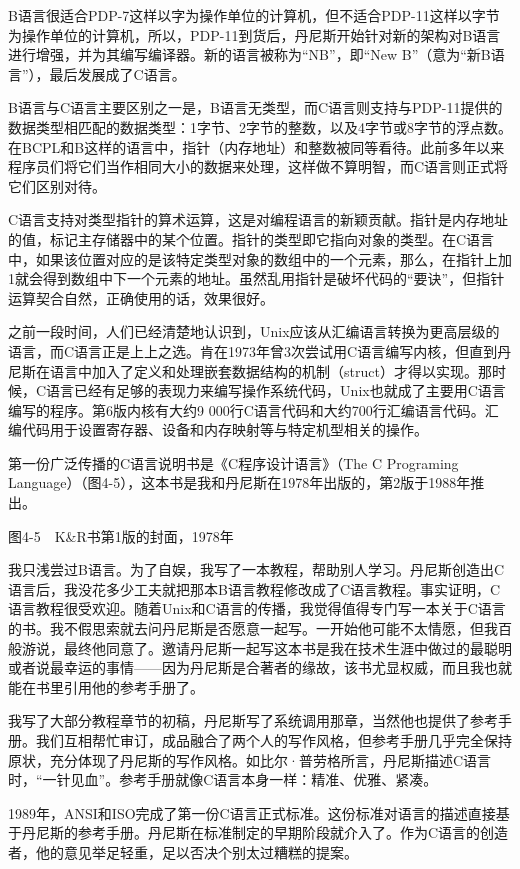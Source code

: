 \documentclass[a4paper,12pt,UTF8,twoside]{ctexbook}
\begin{document}
{B语言很适合PDP-7这样以字为操作单位的计算机，但不适合PDP-11这样以字节为操作单位的计算机，所以，PDP-11到货后，丹尼斯开始针对新的架构对B语言进行增强，并为其编写编译器。新的语言被称为“NB”，即“New B”（意为“新B语言”），最后发展成了C语言。

B语言与C语言主要区别之一是，B语言无类型，而C语言则支持与PDP-11提供的数据类型相匹配的数据类型：1字节、2字节的整数，以及4字节或8字节的浮点数。在BCPL和B这样的语言中，指针（内存地址）和整数被同等看待。此前多年以来程序员们将它们当作相同大小的数据来处理，这样做不算明智，而C语言则正式将它们区别对待。

C语言支持对类型指针的算术运算，这是对编程语言的新颖贡献。指针是内存地址的值，标记主存储器中的某个位置。指针的类型即它指向对象的类型。在C语言中，如果该位置对应的是该特定类型对象的数组中的一个元素，那么，在指针上加1就会得到数组中下一个元素的地址。虽然乱用指针是破坏代码的“要诀”，但指针运算契合自然，正确使用的话，效果很好。

之前一段时间，人们已经清楚地认识到，Unix应该从汇编语言转换为更高层级的语言，而C语言正是上上之选。肯在1973年曾3次尝试用C语言编写内核，但直到丹尼斯在语言中加入了定义和处理嵌套数据结构的机制（struct）才得以实现。那时候，C语言已经有足够的表现力来编写操作系统代码，Unix也就成了主要用C语言编写的程序。第6版内核有大约9 000行C语言代码和大约700行汇编语言代码。汇编代码用于设置寄存器、设备和内存映射等与特定机型相关的操作。

第一份广泛传播的C语言说明书是《C程序设计语言》（The C Programing Language）（图4-5），这本书是我和丹尼斯在1978年出版的，第2版于1988年推出。



图4-5　K\&R书第1版的封面，1978年

我只浅尝过B语言。为了自娱，我写了一本教程，帮助别人学习。丹尼斯创造出C语言后，我没花多少工夫就把那本B语言教程修改成了C语言教程。事实证明，C语言教程很受欢迎。随着Unix和C语言的传播，我觉得值得专门写一本关于C语言的书。我不假思索就去问丹尼斯是否愿意一起写。一开始他可能不太情愿，但我百般游说，最终他同意了。邀请丹尼斯一起写这本书是我在技术生涯中做过的最聪明或者说最幸运的事情——因为丹尼斯是合著者的缘故，该书尤显权威，而且我也就能在书里引用他的参考手册了。

我写了大部分教程章节的初稿，丹尼斯写了系统调用那章，当然他也提供了参考手册。我们互相帮忙审订，成品融合了两个人的写作风格，但参考手册几乎完全保持原状，充分体现了丹尼斯的写作风格。如比尔·普劳格所言，丹尼斯描述C语言时，“一针见血”。参考手册就像C语言本身一样：精准、优雅、紧凑。

1989年，ANSI和ISO完成了第一份C语言正式标准。这份标准对语言的描述直接基于丹尼斯的参考手册。丹尼斯在标准制定的早期阶段就介入了。作为C语言的创造者，他的意见举足轻重，足以否决个别太过糟糕的提案。

}
\end{document}
